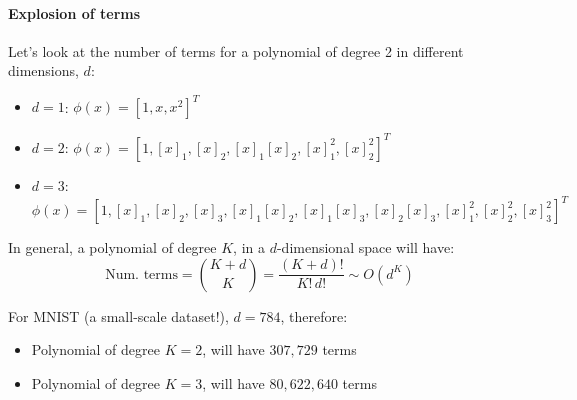 \documentclass[11pt]{article}
\begin{document}
\paragraph{Explosion of terms}
    Let’s look at the number of terms for a polynomial of degree 2 in different dimensions, $d$:
    \begin{itemize}
        \item $d = 1$: \quad $\phi(x) = [1, x, x^2]^T$
        \item $d = 2$: \quad $\phi(x) = [1, [x]_1, [x]_2, [x]_1[x]_2, [x]_1^2, [x]_2^2]^T$
        \item $d = 3$: \quad $\phi(x) = [1, [x]_1, [x]_2, [x]_3, [x]_1[x]_2, [x]_1[x]_3, [x]_2[x]_3, [x]_1^2, [x]_2^2, [x]_3^2]^T$
    \end{itemize}

    \vspace{0.4cm}
    In general, a polynomial of degree $K$, in a $d$-dimensional space will have:
    \[
    \text{Num. terms} = \binom{K+d}{K} = \frac{(K+d)!}{K! \, d!} \sim O(d^K)
    \]

    \vspace{0.4cm}
    For MNIST (a small-scale dataset!), $d = 784$, therefore:
    \begin{itemize}
        \item Polynomial of degree $K=2$, will have $307{,}729$ terms
        \item Polynomial of degree $K=3$, will have $80{,}622{,}640$ terms
    \end{itemize}
 
        
\end{document}

